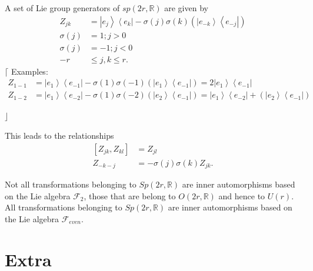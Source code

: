 \documentclass[aps,preprint]{revtex4}
\begin{document}
A set of Lie group generators of $sp\left( 2r,\mathbb{R}\right) $ are given
by 
\begin{align}
Z_{jk} & =\left\vert e_{j}\right\rangle \left\langle e_{k}\right\vert
-\sigma\left( j\right) \sigma\left( k\right) \left( \left\vert
e_{-k}\right\rangle \left\langle e_{-j}\right\vert \right) \\
\sigma\left( j\right) & =1;j>0 \\
\sigma\left( j\right) & =-1;j<0 \\
-r & \leq j,k\leq r.
\end{align}
$\lceil$ Examples:%
\begin{align}
Z_{1-1} & =\left\vert e_{1}\right\rangle \left\langle e_{-1}\right\vert
-\sigma\left( 1\right) \sigma\left( -1\right) \left( \left\vert
e_{1}\right\rangle \left\langle e_{-1}\right\vert \right) =2\left\vert
e_{1}\right\rangle \left\langle e_{-1}\right\vert \\
Z_{1-2} & =\left\vert e_{1}\right\rangle \left\langle e_{-2}\right\vert
-\sigma\left( 1\right) \sigma\left( -2\right) \left( \left\vert
e_{2}\right\rangle \left\langle e_{-1}\right\vert \right) =\left\vert
e_{1}\right\rangle \left\langle e_{-2}\right\vert +\left( \left\vert
e_{2}\right\rangle \left\langle e_{-1}\right\vert \right)
\end{align}

$\rfloor$

This leads to the relationships 
\begin{align}
\left[ Z_{jk},Z_{kl}\right] & =Z_{jl} \\
Z_{-k-j} & =-\sigma\left( j\right) \sigma\left( k\right) Z_{jk}.
\end{align}

Not all transformations belonging to $Sp\left( 2r,\mathbb{R}\right) $ are
inner automorphisms based on the Lie algebra $\mathcal{F}_{2}$, those that
are belong to $O\left( 2r,\mathbb{R}\right) $ and hence to $U\left( r\right)
.$ All transformations belonging to $Sp\left( 2r,\mathbb{R}\right) $ are
inner automorphisms based on the Lie algebra $\mathcal{F}_{even}.$

\section{Extra}
\end{document}
